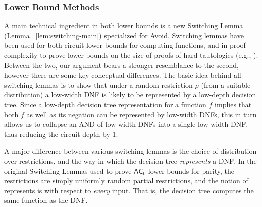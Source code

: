 \documentclass[11pt]{article}
\newcommand{\todo}[1]{\textcolor{red}{TODO: #1}}
\begin{document}
\subsubsection{Lower Bound Methods}
\label{sec:intro-proofoverview} 
A main technical ingredient in both lower bounds is a new Switching Lemma (Lemma ~\ref{lem:switching-main})  specialized for Avoid. 
Switching lemmas have been used for both circuit lower bounds for computing functions, and in proof complexity to prove lower bounds on the size of proofs of hard tautologies (e.g., \cite{beame-sl,razborov-sl,BeameIKPPW92}). Between the two, our argument bears a stronger resemblance to the second, however there are some key conceptual differences. 
The basic idea behind all switching lemmas is to show that under a random restriction $\rho$ (from a suitable distribution) a low-width DNF is likely to be represented by a low-depth decision tree. Since a low-depth decision tree representation for a function $f$ implies that both $f$ as well as its negation can be represented by low-width DNFs, this in turn allows us to collapse an AND of low-width DNFs into a single low-width DNF, thus reducing the circuit depth by 1.

A major difference between various switching lemmas is the choice of  distribution over restrictions, and the way in which the decision tree {\it represents} a DNF. In the original Switching Lemmas used to prove $\mathsf{AC}_0$ lower bounds for parity, the restrictions are simply uniformly random partial restrictions, and the notion of represents is with respect to {\it every} input. That is, the decision tree computes the same function as the DNF.

\end{document}
